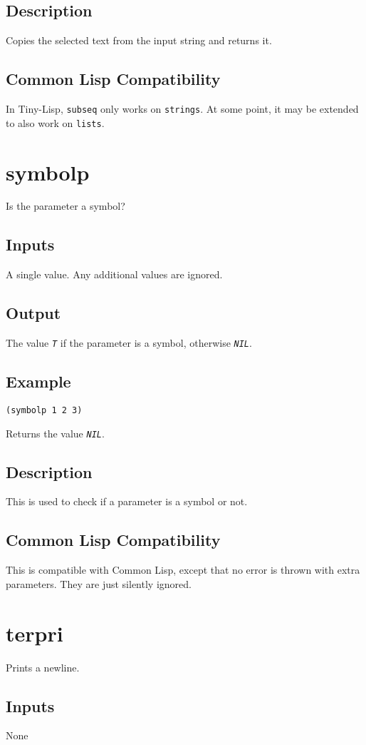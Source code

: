 \documentclass[10pt, openany]{book}
\newcommand{\constant}[1]{\emph{\texttt{#1}}}
\newcommand{\keyword}[1]{\texttt{#1}}
\newcommand{\datatype}[1]{\texttt{#1}}
\newcommand{\tl}{Tiny-Lisp}
\newcommand{\cl}{Common Lisp}
\begin{document}
\subsection{Description}
Copies the selected text from the input string and returns it.
\subsection{Common Lisp Compatibility}
In \tl, \keyword{subseq} only works on \datatype{strings}.  At some point, it may be extended to also work on \datatype{lists}.

\section{symbolp}
Is the parameter a symbol?
\subsection{Inputs}
A single value.  Any additional values are ignored.
\subsection{Output}
The value \constant{T} if the parameter is a symbol, otherwise \constant{NIL}.
\subsection{Example}
\begin{lstlisting}
(symbolp 1 2 3)
\end{lstlisting}
Returns the value \constant{NIL}.
\subsection{Description}
This is used to check if a parameter is a symbol or not.
\subsection{Common Lisp Compatibility}
This is compatible with \cl, except that no error is thrown with extra parameters.  They are just silently ignored.

\section{terpri}
Prints a newline.
\subsection{Inputs}
None
\end{document}
